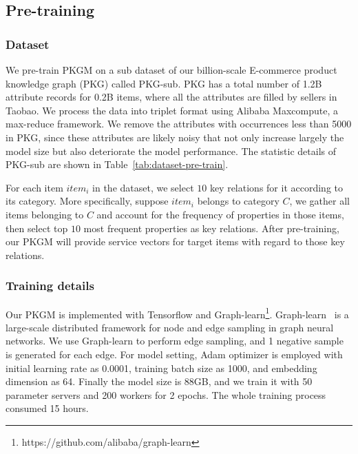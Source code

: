 \subsection{Pre-training}

\subsubsection{Dataset}
We pre-train PKGM on a sub dataset of our billion-scale E-commerce product knowledge graph (PKG) called PKG-sub. PKG has a total number of 1.2B attribute records for 0.2B items, where all the attributes are filled by sellers in Taobao. We process the data into triplet format using Alibaba Maxcompute, a max-reduce framework. We remove the attributes with occurrences less than 5000 in PKG, since these attributes are likely noisy that not only increase largely the model size but also deteriorate the model performance. The statistic details of PKG-sub are shown in Table~\ref{tab:dataset-pre-train}.   


For each item $item_i$ in the dataset, we select $10$ key relations for it according to its category. More specifically, suppose $item_i$ belongs to category $C$, we gather all items belonging to $C$ and account for the frequency of properties in those items, then select top $10$ most frequent properties as key relations. After pre-training, our PKGM will provide service vectors for target items with regard to those key relations. 

\subsubsection{Training details}
Our PKGM is implemented with Tensorflow\cite{tensorflow} and Graph-learn\footnote{https://github.com/alibaba/graph-learn}. Graph-learn~\cite{zhu2019aligraph} is a large-scale distributed framework for node and edge sampling in graph neural networks. We use Graph-learn to perform edge sampling, and 1 negative sample is generated for each edge.  For model setting, Adam\cite{adam} optimizer is employed with initial learning rate as 0.0001, training batch size as 1000, and embedding dimension as 64. Finally the model size is 88GB, and we train it with 50 parameter servers and 200 workers for 2 epochs. The whole training process consumed 15 hours.